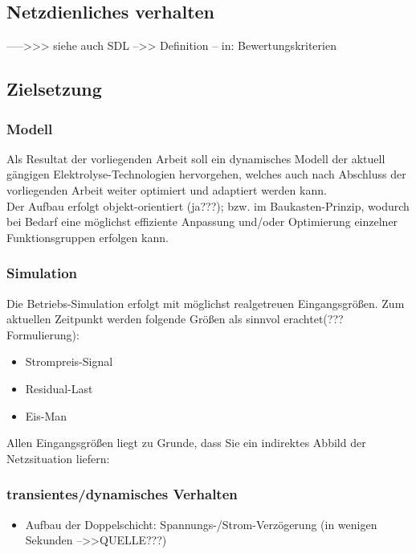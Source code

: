 \documentclass[onecolumn,10pt,titlepage]{article}
\begin{document}
\subsection{Netzdienliches verhalten}
----->>> siehe auch SDL
-->> Definition
-- in: Bewertungskriterien

\subsection{Zielsetzung}
\subsubsection{Modell}
Als Resultat der vorliegenden Arbeit soll ein dynamisches Modell der aktuell gängigen Elektrolyse-Technologien hervorgehen, welches auch nach Abschluss der vorliegenden Arbeit weiter optimiert und adaptiert werden kann.\\
Der Aufbau erfolgt objekt-orientiert (ja???); bzw. im Baukasten-Prinzip, wodurch bei Bedarf eine möglichst effiziente Anpassung und/oder Optimierung einzelner Funktionsgruppen erfolgen kann.
\subsubsection{Simulation}
Die Betriebs-Simulation erfolgt mit möglichst realgetreuen Eingangsgrößen. Zum aktuellen Zeitpunkt werden folgende Größen als sinnvol erachtet(???Formulierung):
\begin{itemize}
	\item Strompreis-Signal
	\item Residual-Last
	\item Eis-Man
\end{itemize}  
Allen Eingangsgrößen liegt zu Grunde, dass Sie ein indirektes Abbild der Netzsituation liefern: 

\subsubsection{transientes/dynamisches Verhalten}
\begin{itemize}
	\item Aufbau der Doppelschicht: Spannungs-/Strom-Verzögerung (in wenigen Sekunden -->>QUELLE???)
	
\end{itemize}

\end{document}
